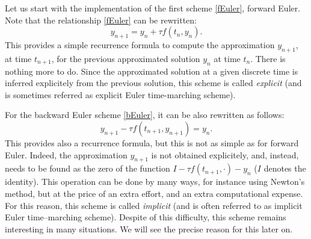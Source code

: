 \documentclass{article}
\begin{document}
Let us start with the implementation of the first scheme \eqref{fEuler}, forward Euler. Note that the relationship \eqref{fEuler} can be rewritten:
\begin{equation} \label{fEuler2}
        y_{n+1} = y_n + \tau f(t_n,y_n).
\end{equation}
This provides a simple recurrence formula to compute the approximation $y_{n+1}$, at time $t_{n+1}$, for the previous approximated solution $y_n$ at time $t_n$. There is nothing more to do. Since the approximated solution at a given discrete time is inferred explicitely from the previous solution, this scheme is called \emph{explicit} (and is sometimes referred as explicit Euler time-marching scheme).
%
%
%
%
%
%
%
%
%
%
%

For the backward Euler scheme \eqref{bEuler}, it can be also rewritten as follows:
 \begin{equation} \label{bEuler2}
        y_{n+1} - {\tau} f(t_{n+1},y_{n+1}) = y_n .
    \end{equation}
This provides also a recurrence formula, but this is not as simple as for forward Euler. Indeed, the approximation $y_{n+1}$ is not obtained explicitely, and, instead, needs to be found as the zero of the function
$I - {\tau} f(t_{n+1},\cdot) - y_n$ ($I$ denotes the identity). This operation can be done by many ways, for instance using Newton's method, but at the price of an extra effort, and an extra computational expense.
For this reason, this scheme is called \emph{implicit} (and is often referred to as implicit Euler time--marching scheme).
Despite of this difficulty, this scheme remains interesting in many situations. We will see the precise reason for this later on. 
\end{document}
